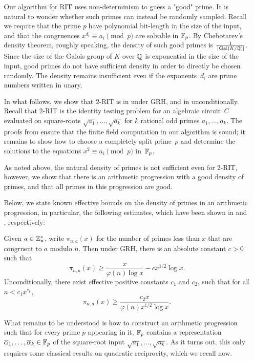 Our algorithm for RIT uses non-determinism to guess a "good" prime.  It is natural to wonder whether such primes can instead be randomly sampled.
Recall we require that the prime $p$ have polynomial bit-length in the size of the input, and that  the congruences $x^{d_i} \equiv a_i \pmod{p}$ are solvable in $\mathbb{F}_p$. By Chebotarev's density theorem, roughly speaking, the density of such good primes is
$\frac{1}{|\operatorname{Gal}(K/\mathbb{Q})|}$.
Since the size of the Galois group of $K$ over $\mathbb{Q}$ is exponential in the size of the input, good primes do not have sufficient density in order to directly be chosen randomly. 
The density remains insufficient even if the exponents~$d_i$ are prime numbers written in unary.
 

In what follows, we show that   $2$-RIT is in {\coRP} under GRH, and  in {\coNP} unconditionally. Recall that  $2$-RIT  is the identity testing problem for an algebraic circuit~$C$ evaluated on square-roots
$\sqrt{a_1},\ldots,\sqrt{a_k}$ for 
$k$ rational odd primes $a_1,\ldots,a_k$.
The proofs from  ensure that the finite field computation in our algorithm is sound; it remains to show how to choose a completely split prime~$p$ and determine the solutions to the equations $x^{2} \equiv a_i \pmod{p}$  in~$\mathbb{F}_p$.


As noted above, 
the natural density of primes is not sufficient even for  $2$-RIT, 
however, we show that there is an arithmetic progression with a good density of primes, and that all primes in this progression are good.

Below, we state known effective bounds on the density of primes in an arithmetic progression, in particular, the following estimates, which have been shown in \cite[Chapter 20, page 125]{davenport} and \cite[Corollary 18.8]{IKbook}, respectively:

\begin{theorem}\label{th:prime_density}
	Given $a\in\mathbb{Z}_n^*$, write $\pi_{n,a}(x)$ for the number of primes less than $x$ that are congruent to $a$ modulo $n$. Then under GRH, there is an absolute constant $c>0$ such that
	\[ \pi_{n,a}(x) \geq \frac{x}{\varphi(n)\log x} - c x^{1/2}\log x.\]
	Unconditionally, there exist effective positive constants $c_1$ and $c_2$, such that for all $n < c_1 x^{c_1}$,
	\[ \pi_{n,a}(x) \geq \frac{c_2 x}{\varphi(n)x^{1/2}\log x}. \]
\end{theorem}

What remains to be understood is how to construct an arithmetic progression such that for every prime $p$ appearing in it, $\mathbb{F}_p$ contains a representation $\overline{\alpha}_1,\ldots,\overline{\alpha}_k\in\mathbb{F}_p$ of the square-root input $\sqrt{a_1},\ldots,\sqrt{a_k}$. As it turns out, this only
requires some classical results on quadratic reciprocity,
which we recall now.

